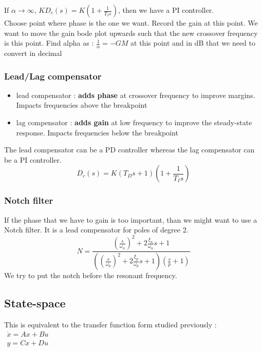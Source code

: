 \documentclass[../main.tex]{subfiles}
\begin{document}
If $\alpha \rightarrow \infty$, $KD_c(s) = K(1+\frac{1}{T_Is})$, then we have a PI controller.\\

Choose point where phase is the one we want. Record the gain at this point. We want to move the gain bode plot upwards such that the new crossover frequency is this point. Find alpha as : $\frac{1}{\alpha} = -GM$ at this point and in dB that we need to convert in decimal \warning \\

\subsubsection{Lead/Lag compensator}
\begin{itemize}
    \item lead compensator : \textbf{adds phase} at crossover frequency to improve margins. Impacts frequencies above the breakpoint\\
    \item lag compensator : \textbf{adds gain} at low frequency to improve the steady-state response. Impacts frequencies below the breakpoint\\
\end{itemize}

The lead compensator can be a PD controller whereas the lag compensator can be a PI controller.\\

\begin{equation}
    D_c(s) = K(T_Ds+1)(1+\frac{1}{T_Is})
\end{equation}

\subsubsection{Notch filter}
If the phase that we have to gain is too important, than we might want to use a Notch filter. It is a lead compensator for poles of degree 2.\\
\begin{equation}
    N = \frac{(\frac{s}{\omega_n})^2 + 2 \frac{\xi_n}{\omega_n}s+1}{((\frac{s}{\omega_p})^2 + 2 \frac{\xi_p}{\omega_p}s+1) (\frac{s}{p}+1)}
\end{equation}
We try to put the notch before the resonant frequency.\\


\subsection{State-space}
This is equivalent to the transfer function form studied previously : $\begin{matrix}
    \dot{x} = Ax+Bu\\
    y = Cx + Du\\
\end{matrix}$\\
\end{document}
